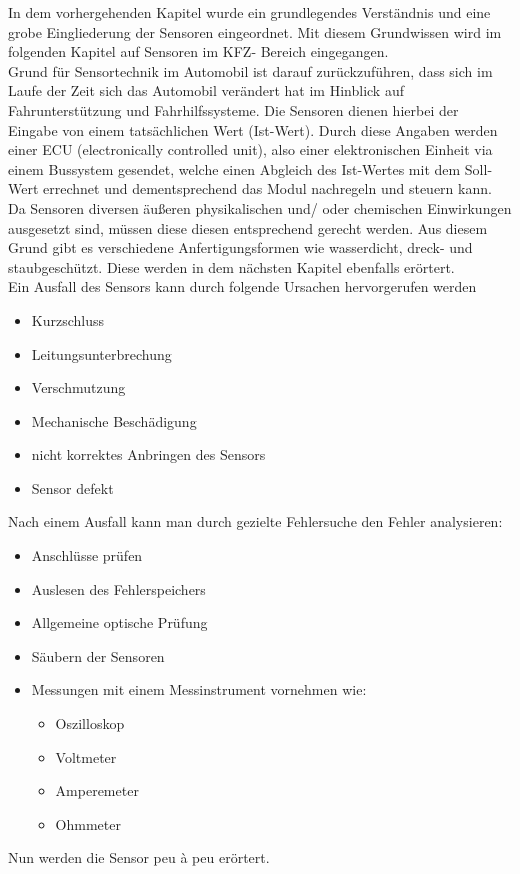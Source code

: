 \documentclass{article}
\begin{document}
			\begin{flushleft}
				In dem vorhergehenden Kapitel wurde ein grundlegendes Verständnis und eine grobe Eingliederung der Sensoren eingeordnet. Mit diesem Grundwissen wird im folgenden Kapitel auf Sensoren im KFZ- Bereich eingegangen.\\
				Grund für Sensortechnik im Automobil ist darauf zurückzuführen, dass sich im Laufe der Zeit sich das Automobil verändert hat im Hinblick auf Fahrunterstützung und Fahrhilfssysteme.
				Die Sensoren dienen hierbei der Eingabe von einem tatsächlichen Wert (Ist-Wert). Durch diese Angaben werden einer ECU (electronically controlled unit), also einer elektronischen Einheit via einem Bussystem gesendet, welche einen Abgleich des Ist-Wertes mit dem Soll-Wert errechnet und dementsprechend das Modul nachregeln und steuern kann. \\ 
				Da Sensoren diversen äußeren physikalischen und/ oder chemischen Einwirkungen ausgesetzt sind, müssen diese diesen entsprechend gerecht werden. Aus diesem Grund gibt es verschiedene Anfertigungsformen wie wasserdicht, dreck- und staubgeschützt. Diese werden in dem nächsten Kapitel ebenfalls erörtert.\\  
				
				Ein Ausfall des Sensors kann durch folgende Ursachen hervorgerufen werden
				\begin{itemize}
					\item Kurzschluss
					\item Leitungsunterbrechung
					\item Verschmutzung
					\item Mechanische Beschädigung
					\item nicht korrektes Anbringen des Sensors
					\item Sensor defekt
				\end{itemize}	
				
				Nach einem Ausfall kann man durch gezielte Fehlersuche den Fehler analysieren:
				\begin{itemize}
					\item Anschlüsse prüfen
					\item Auslesen des Fehlerspeichers
					\item Allgemeine optische Prüfung
					\item Säubern der Sensoren
					\item Messungen mit einem Messinstrument vornehmen wie:
					\begin{itemize}
						\item Oszilloskop 
						\item Voltmeter
						\item Amperemeter
						\item Ohmmeter	
					\end{itemize}
					
				\end{itemize}					

				Nun werden die Sensor peu à peu erörtert. 



		\end{flushleft}	
		
\end{document}
